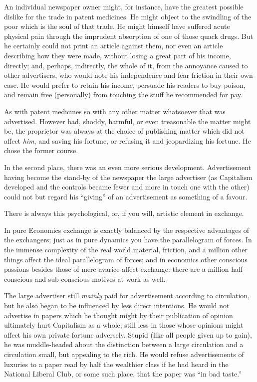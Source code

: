 \documentclass{book}
\begin{document}
An individual newspaper owner might, for instance, have the greatest possible dislike for the trade in patent medicines. He might object to the swindling of the poor which is the soul of that trade. He might himself have suffered acute physical pain through the imprudent absorption of one of those quack drugs. But he certainly could not print an article against them, nor even an article describing how they were made, without losing a great part of his income, directly; and, perhaps, indirectly, the whole of it, from the annoyance caused to other advertisers, who would note his independence and fear friction in their own case. He would prefer to retain his income, persuade his readers to buy poison, and remain free (personally) from touching the stuff he recommended for pay.

As with patent medicines so with any other matter whatsoever that was advertised. However bad, shoddy, harmful, or even treasonable the matter might be, the proprietor was always at the choice of publishing matter which did not affect \emph{him}, and saving his fortune, or refusing it and jeopardizing his fortune. He chose the former course.

In the second place, there was an even more serious development. Advertisement having become the stand-by of the newspaper the large advertiser (as Capitalism developed and the controls became fewer and more in touch one with the other) could not but regard his “giving” of an advertisement as something of a favour.

There is always this psychological, or, if you will, artistic element in exchange.

In pure Economics exchange is exactly balanced by the respective advantages of the exchangers; just as in pure dynamics you have the parallelogram of forces. In the immense complexity of the real world material, friction, and a million other things affect the ideal parallelogram of forces; and in economics other conscious passions besides those of mere avarice affect exchange: there are a million half-conscious and sub-conscious motives at work as well.

The large advertiser still \emph{mainly} paid for advertisement according to circulation, but he also began to be influenced by less direct intentions. He would not advertise in papers which he thought might by their publication of opinion ultimately hurt Capitalism as a whole; still less in those whose opinions might affect his own private fortune adversely. Stupid (like all people given up to gain), he was muddle-headed about the distinction between a large circulation and a circulation small, but appealing to the rich. He would refuse advertisements of luxuries to a paper read by half the wealthier class if he had heard in the National Liberal Club, or some such place, that the paper was “in bad taste.”
\end{document}
